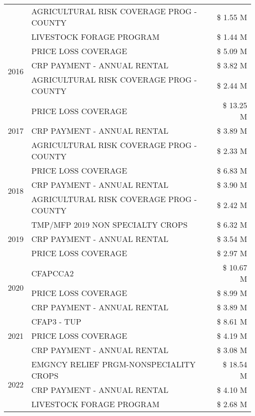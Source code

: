 \begin{tabular}{llr}
 & AGRICULTURAL RISK COVERAGE PROG - COUNTY & \$ 1.55 M \\
 & LIVESTOCK FORAGE PROGRAM & \$ 1.44 M \\
\cline{1-3}
\multirow[t]{3}{*}{2016} & PRICE LOSS COVERAGE & \$ 5.09 M \\
 & CRP PAYMENT - ANNUAL RENTAL & \$ 3.82 M \\
 & AGRICULTURAL RISK COVERAGE PROG - COUNTY & \$ 2.44 M \\
\cline{1-3}
\multirow[t]{3}{*}{2017} & PRICE LOSS COVERAGE & \$ 13.25 M \\
 & CRP PAYMENT - ANNUAL RENTAL & \$ 3.89 M \\
 & AGRICULTURAL RISK COVERAGE PROG - COUNTY & \$ 2.33 M \\
\cline{1-3}
\multirow[t]{3}{*}{2018} & PRICE LOSS COVERAGE & \$ 6.83 M \\
 & CRP PAYMENT - ANNUAL RENTAL & \$ 3.90 M \\
 & AGRICULTURAL RISK COVERAGE PROG - COUNTY & \$ 2.42 M \\
\cline{1-3}
\multirow[t]{3}{*}{2019} & TMP/MFP 2019 NON SPECIALTY CROPS & \$ 6.32 M \\
 & CRP PAYMENT - ANNUAL RENTAL & \$ 3.54 M \\
 & PRICE LOSS COVERAGE & \$ 2.97 M \\
\cline{1-3}
\multirow[t]{3}{*}{2020} & CFAPCCA2 & \$ 10.67 M \\
 & PRICE LOSS COVERAGE & \$ 8.99 M \\
 & CRP PAYMENT - ANNUAL RENTAL & \$ 3.89 M \\
\cline{1-3}
\multirow[t]{3}{*}{2021} & CFAP3 - TUP & \$ 8.61 M \\
 & PRICE LOSS COVERAGE & \$ 4.19 M \\
 & CRP PAYMENT - ANNUAL RENTAL & \$ 3.08 M \\
\cline{1-3}
\multirow[t]{3}{*}{2022} & EMGNCY RELIEF PRGM-NONSPECIALITY CROPS & \$ 18.54 M \\
 & CRP PAYMENT - ANNUAL RENTAL & \$ 4.10 M \\
 & LIVESTOCK FORAGE PROGRAM & \$ 2.68 M \\
\cline{1-3}
\bottomrule
\end{tabular}
